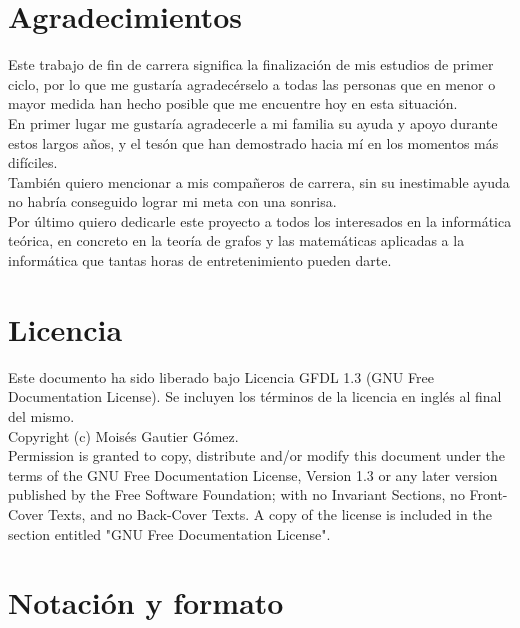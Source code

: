 \section*{Agradecimientos}

Este trabajo de fin de carrera significa la finalización de mis estudios de primer ciclo, por lo que me gustaría agradecérselo a todas las personas que en menor o mayor medida han hecho posible que me encuentre hoy en esta situación.\\

En primer lugar me gustaría agradecerle a mi familia su ayuda y apoyo durante estos largos años, y el tesón que han demostrado hacia mí en los momentos más difíciles.\\

También quiero mencionar a mis compañeros de carrera, sin su inestimable ayuda no habría conseguido lograr mi meta con una sonrisa.\\

Por último quiero dedicarle este proyecto a todos los interesados en la informática teórica, en concreto en la teoría de grafos y las matemáticas aplicadas a la informática que tantas horas de entretenimiento pueden darte.\\


\cleardoublepage

\section*{Licencia}

Este documento ha sido liberado bajo Licencia GFDL 1.3 (GNU Free
Documentation License). Se incluyen los términos de la licencia en
inglés al final del mismo.\\

Copyright (c) Moisés Gautier Gómez.\\

Permission is granted to copy, distribute and/or modify this document
under the terms of the GNU Free Documentation License, Version 1.3 or
any later version published by the Free Software Foundation; with no
Invariant Sections, no Front-Cover Texts, and no Back-Cover Texts. A
copy of the license is included in the section entitled "GNU Free
Documentation License".\\

\cleardoublepage

\section*{Notación y formato}

